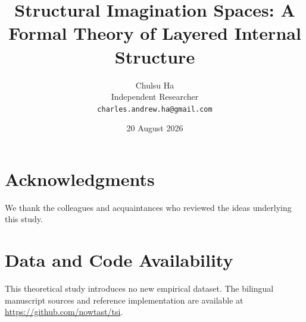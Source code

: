 \documentclass[11pt]{article}
\title{Structural Imagination Spaces: A Formal Theory of Layered Internal Structure}
\author{Chulsu Ha\\Independent Researcher\\\texttt{charles.andrew.ha@gmail.com}}
\date{20 August 2026}
\begin{document}
\maketitle













\section*{Acknowledgments}
We thank the colleagues and acquaintances who reviewed the ideas underlying
this study.

\section*{Data and Code Availability}
This theoretical study introduces no new empirical dataset. The bilingual
manuscript sources and reference implementation are available at
\url{https://github.com/nowtast/tsi}.


\end{document}
